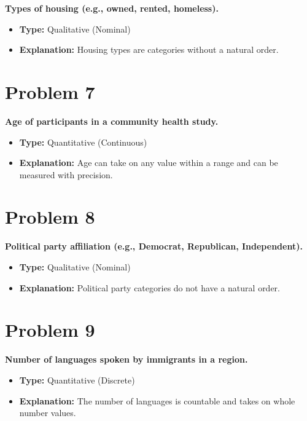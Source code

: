 \documentclass[
  letterpaper,
  DIV=11,
  numbers=noendperiod]{scrreprt}
\begin{document}
\textbf{Types of housing (e.g., owned, rented, homeless).}

\begin{itemize}
\item
  \textbf{Type:} Qualitative (Nominal)
\item
  \textbf{Explanation:} Housing types are categories without a natural
  order.
\end{itemize}

\section*{Problem 7}\label{problem-7-2}


\textbf{Age of participants in a community health study.}

\begin{itemize}
\item
  \textbf{Type:} Quantitative (Continuous)
\item
  \textbf{Explanation:} Age can take on any value within a range and can
  be measured with precision.
\end{itemize}

\section*{Problem 8}\label{problem-8-2}


\textbf{Political party affiliation (e.g., Democrat, Republican,
Independent).}

\begin{itemize}
\item
  \textbf{Type:} Qualitative (Nominal)
\item
  \textbf{Explanation:} Political party categories do not have a natural
  order.
\end{itemize}

\section*{Problem 9}\label{problem-9-2}


\textbf{Number of languages spoken by immigrants in a region.}

\begin{itemize}
\item
  \textbf{Type:} Quantitative (Discrete)
\item
  \textbf{Explanation:} The number of languages is countable and takes
  on whole number values.
\end{itemize}
\end{document}

